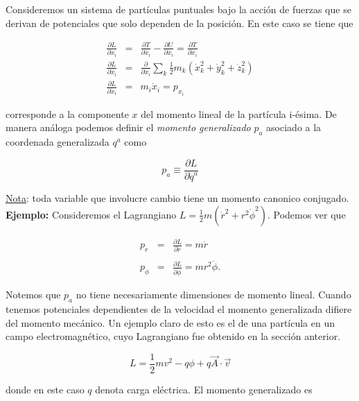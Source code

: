 \documentclass[12pt]{report}
\begin{document}
Consideremos un sistema de partículas puntuales bajo la acción de fuerzas que se derivan de potenciales que solo dependen de la posición. En este caso se tiene que

\begin{eqnarray}
\frac{\partial L}{\partial \dot{x}_i}&=&\frac{\partial T}{\partial \dot{x}_i} - \frac{\partial U}{\partial \dot{x}_i} = \frac{\partial T}{\partial \dot{x}_i} \\
 \frac{\partial L}{\partial \dot{x}_i}&=& \frac{\partial }{\partial \dot{x}_i} \sum_{k} \frac{1}{2} m_k \left( \dot{x}_k^2 + \dot{y}_k^2  + \dot{z}_k^2  \right)  \\
 \frac{\partial L}{\partial \dot{x}_i} &=& m_i \dot{x}_i = p_{x_i}
\end{eqnarray} 


corresponde a la componente $x$ del momento lineal de la partícula i-ésima.
De manera análoga podemos definir el \textit{momento generalizado} $p_a$ asociado a la coordenada generalizada $q^a$ como

\begin{equation}
p_a  \equiv \frac{\partial L}{\partial \dot{q}^a}
\end{equation}

\underline{Nota}: toda variable que involucre cambio tiene un momento canonico conjugado. \\

\textbf{Ejemplo:} Consideremos el Lagrangiano $L=\displaystyle\frac{1}{2}m \left( \dot{r}^2 + r^2\dot{\phi}^2 \right)$. Podemos ver que 


\begin{eqnarray}
p_{r} &=& \frac{\partial L}{\partial \dot{r}} = m \dot{r} \\
\\
p_{\phi} &=&\frac{\partial L}{\partial \dot{\phi}} = mr^2 \dot{\phi}.
\end{eqnarray}

Notemos que $p_a$ no tiene necesariamente dimensiones  de momento lineal. Cuando tenemos potenciales dependientes de la velocidad el momento generalizada difiere del momento mecánico. Un ejemplo claro de esto es el de una partícula en un campo electromagnético, cuyo Lagrangiano fue obtenido en la sección anterior.

\begin{equation}
L=\frac{1}{2}mv^2 - q\phi + q \vec{A} \cdot \vec{v} 
\end{equation}

donde en este caso $q$ denota carga eléctrica. El momento generalizado es 
\end{document}
